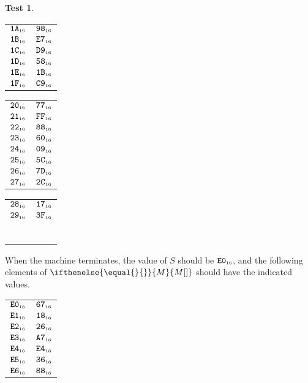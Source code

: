\documentclass[a4paper,12pt]{article}
\makeatletter
\newcommand{\num}[1]{\texttt{#1}}
\newcommand{\hex}[1]{\num{#1}_{\textup{\tiny 16}}}
\newcommand{\MEM}[1]{\ifthenelse{\equal{#1}{}}{M}{M[#1]}}
\newcommand{\SP}{S}
\theoremstyle{definition}
\newtheorem{test}{Test}
\newenvironment{memtable}{%
  \begin{trivlist}
    \item
    }{%
    \end{trivlist}}
\newenvironment{memcolumn}{%
  \begin{tabular}{@{}ll@{}}
    \hline}
    {%
    \hline
  \end{tabular}}
\newcommand{\memspace}{\qquad}
\makeatother
\begin{document}
\begin{test}
\begin{memtable}
\begin{memcolumn}
      $\hex{1A}$ & $\hex{98}$ \\
      $\hex{1B}$ & $\hex{E7}$ \\
      $\hex{1C}$ & $\hex{D9}$ \\
      $\hex{1D}$ & $\hex{58}$ \\
      $\hex{1E}$ & $\hex{1B}$ \\
      $\hex{1F}$ & $\hex{C9}$ \\
    \end{memcolumn}
    \memspace
    \begin{memcolumn}
      $\hex{20}$ & $\hex{77}$ \\
      $\hex{21}$ & $\hex{FF}$ \\
      $\hex{22}$ & $\hex{88}$ \\
      $\hex{23}$ & $\hex{60}$ \\
      $\hex{24}$ & $\hex{09}$ \\
      $\hex{25}$ & $\hex{5C}$ \\
      $\hex{26}$ & $\hex{7D}$ \\
      $\hex{27}$ & $\hex{2C}$ \\
    \end{memcolumn}
    \memspace
    \begin{memcolumn}
      $\hex{28}$ & $\hex{17}$ \\
      $\hex{29}$ & $\hex{3F}$ \\
      \\
      \\
      \\
      \\
      \\
      \\
    \end{memcolumn}
  \end{memtable}
  When the machine terminates, the value of $\SP$ should be $\hex{E0}$, and the following elements of $\MEM{}$ should have the indicated values.
  \begin{memtable}
    \begin{memcolumn}
      $\hex{E0}$ & $\hex{67}$ \\
      $\hex{E1}$ & $\hex{18}$ \\
      $\hex{E2}$ & $\hex{26}$ \\
      $\hex{E3}$ & $\hex{A7}$ \\
      $\hex{E4}$ & $\hex{E4}$ \\
      $\hex{E5}$ & $\hex{36}$ \\
      $\hex{E6}$ & $\hex{88}$ \\

\end{memcolumn}
\end{memtable}
\end{test}
\end{document}
